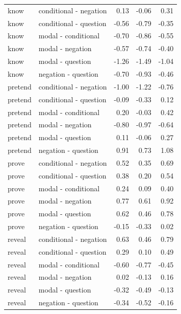 \documentclass[a4paper,12pt,twoside]{article}
\begin{document}
\begin{longtable}{llrrr}
      know & conditional - negation & 0.13 & -0.06 & 0.31 \\ 
      know & conditional - question & -0.56 & -0.79 & -0.35 \\ 
      know & modal - conditional & -0.70 & -0.86 & -0.55 \\ 
      know & modal - negation & -0.57 & -0.74 & -0.40 \\ 
      know & modal - question & -1.26 & -1.49 & -1.04 \\ 
      know & negation - question & -0.70 & -0.93 & -0.46 \\ \midrule

      pretend & conditional - negation & -1.00 & -1.22 & -0.76 \\ 
      pretend & conditional - question & -0.09 & -0.33 & 0.12 \\ 
      pretend & modal - conditional & 0.20 & -0.03 & 0.42 \\ 
      pretend & modal - negation & -0.80 & -0.97 & -0.64 \\ 
      pretend & modal - question & 0.11 & -0.06 & 0.27 \\ 
      pretend & negation - question & 0.91 & 0.73 & 1.08 \\ \midrule

      prove & conditional - negation & 0.52 & 0.35 & 0.69 \\ 
      prove & conditional - question & 0.38 & 0.20 & 0.54 \\ 
      prove & modal - conditional & 0.24 & 0.09 & 0.40 \\ 
      prove & modal - negation & 0.77 & 0.61 & 0.92 \\ 
      prove & modal - question & 0.62 & 0.46 & 0.78 \\ 
      prove & negation - question & -0.15 & -0.33 & 0.02 \\ \midrule

      reveal & conditional - negation & 0.63 & 0.46 & 0.79 \\ 
      reveal & conditional - question & 0.29 & 0.10 & 0.49 \\ 
      reveal & modal - conditional & -0.60 & -0.77 & -0.45 \\ 
      reveal & modal - negation & 0.02 & -0.13 & 0.16 \\ 
      reveal & modal - question & -0.32 & -0.49 & -0.13 \\ 
      reveal & negation - question & -0.34 & -0.52 & -0.16 \\ \midrule


\end{longtable}
\end{document}
